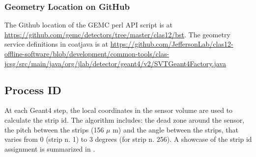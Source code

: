 \subsubsection{Geometry Location on GitHub}
The Github location of the GEMC perl API script is at \url{https://github.com/gemc/detectors/tree/master/clas12/bst}.
The geometry service definitions in coatjava is at
\url{https://github.com/JeffersonLab/clas12-offline-software/blob/development/common-tools/clas-jcsg/src/main/java/org/jlab/detector/geant4/v2/SVTGeant4Factory.java}


\subsection{Process ID}

At each Geant4 step, the local coordinates in the sensor volume are used to calculate the strip id.
The algorithm includes: the dead zone around the sensor, the pitch between the strips (156 $\mu$ m) and the angle
between the strips, that varies from 0 (strip n. 1) to 3 degrees (for strip n. 256). A showcase of the strip id assignment
is summarized in .

